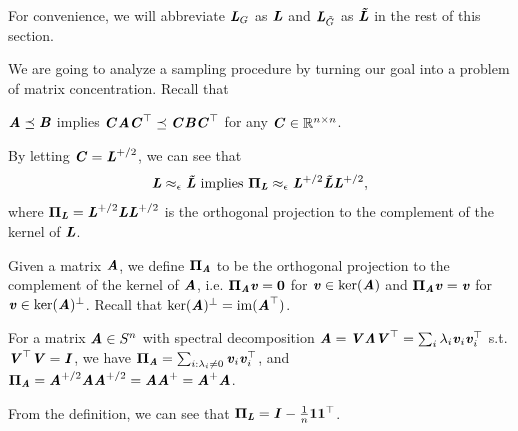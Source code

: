 \begin{remark}
  For convenience, we will abbreviate $\LL_{G}$ as $\LL$ and
  $\LL_{\Gtil}$ as $\LLtil$ in the rest of this section.
\end{remark}


We are going to analyze a sampling procedure by turning our goal into
a problem of matrix concentration.
Recall that
\begin{fact}
  $\AA \preceq \BB$ implies $\CC \AA \CC^\trp \preceq \CC \BB \CC^\trp
  $ for any $\CC \in \R^{n\times n}$.
\end{fact}
By letting $\CC = \LL^{\pinv/2}$, we can see that
\begin{equation}
  \label{eq:spectralreltoabs}
  \LL \approx_{\epsilon} \LLtil \text{ implies } \PPi_{\LL}
  \approx_{\epsilon} \LL^{\pinv/2}\LLtil\LL^{\pinv/2}
  ,
\end{equation}
where $\PPi_{\LL} = \LL^{\pinv/2}\LL\LL^{\pinv/2}$ is the orthogonal
projection to the complement of the kernel of $\LL$.
\begin{definition}
  Given a matrix $\AA$, we define $\PPi_{\AA}$ to be the orthogonal
  projection to the complement of the kernel of $\AA$,
  i.e. $\PPi_{\AA} \vv = \veczero$ for $\vv \in \ker(\AA)$ and
  $\PPi_{\AA} \vv = \vv$ for $\vv \in  \ker(\AA)^{\perp}$.
  Recall that $\ker(\AA)^{\perp} = \im(\AA^{\trp})$.
\end{definition}
\begin{claim}
  For a matrix $\AA \in \symsetn$ with spectral decomposition  $\AA =
  \VV\LLambda\VV^\trp = \sum_{i} \lambda_i \vv_i \vv_i^{\trp}$ s.t. $\VV^\trp \VV = \II$,
  we have $\PPi_{\AA} = \sum_{i : \lambda_i \neq 0} \vv_i \vv_i^{\trp}$, and
  $\PPi_{\AA} = \AA^{\pinv/2}\AA\AA^{\pinv/2} = \AA\AA^{\pinv} =  \AA^{\pinv}\AA $.
\end{claim}
From the definition, we can see that
$\PPi_{\LL}= \II - \frac{1}{n}\vecone\vecone^{\trp}$.

